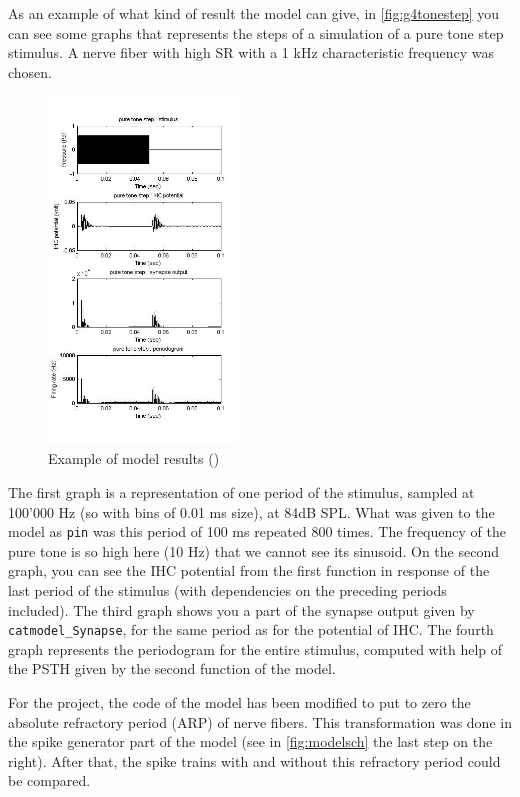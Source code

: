 As an example of what kind of result the model can give,
in \autoref{fig:g4tonestep} you can see some graphs that represents the steps of a 
simulation of a pure tone step stimulus.
A nerve fiber with high SR with a 1 kHz characteristic frequency 
was chosen.


\begin{figure}[h]
	\centering
	\includegraphics[width=0.45\textwidth]{images/g4-tonestep-column2.jpg}
	\caption{Example of model results (\cite{Model1})}
	\label{fig:g4tonestep}
\end{figure}

The first graph is a representation of one period of the stimulus, 
sampled at 100'000 Hz (so with bins of 0.01 ms size), at 84dB SPL.
What was given to the model as \texttt{pin} was this period of 100 ms repeated 800
times. The frequency of the pure tone is so high here (10 Hz) that we cannot see its sinusoid.
On the second graph, you can see the IHC potential from the first function
in response of the last period of the stimulus 
(with dependencies on the preceding periods included).
The third graph shows you a part of the synapse output given by \texttt{catmodel\_Synapse}, 
for the same period as for the potential of IHC.
The fourth graph represents the periodogram for the entire stimulus, 
computed with help of the PSTH given by the second function of the model.

For the project, the code of the model has been modified to put to zero 
the absolute refractory period (ARP) of nerve fibers. 
This transformation was done in the spike generator 
part of the model (see in \autoref{fig:modelsch} the last step on the right).
After that, the spike trains with and without this refractory period could be compared.

